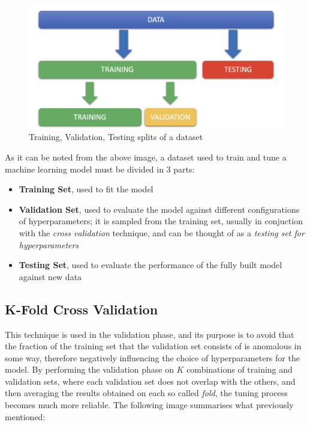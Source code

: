 \begin{figure}[h]
    \centering
    \includegraphics[scale=0.6]{images/train-val-test/train-val-test-split.png}
    \caption{Training, Validation, Testing splits of a dataset}
    \label{fig:train_val_test_splits}
\end{figure}

As it can be noted from the above image, a dataset used to train and tune a machine learning model must be divided in 3 parts:

\begin{itemize}
    \item \textbf{Training Set}, used to fit the model
    \item \textbf{Validation Set}, used to evaluate the model against different configurations of hyperparameters; it is sampled from the training set, usually in conjuction with the \textit{cross validation} technique, and can be thought of as a \textit{testing set for hyperparameters}
    \item \textbf{Testing Set}, used to evaluate the performance of the fully built model against new data
\end{itemize}

\subsection{K-Fold Cross Validation}

This technique is used in the validation phase, and its purpose is to avoid that the fraction of the training set that the validation set consists of is anomalous in some way, therefore negatively influencing the choice of hyperparameters for the model.
By performing the validation phase on $K$ combinations of training and validation sets, where each validation set does not overlap with the others, and then averaging the results obtained on each so called \textit{fold}, the tuning process becomes much more reliable. 
The following image summarises what previously mentioned:

